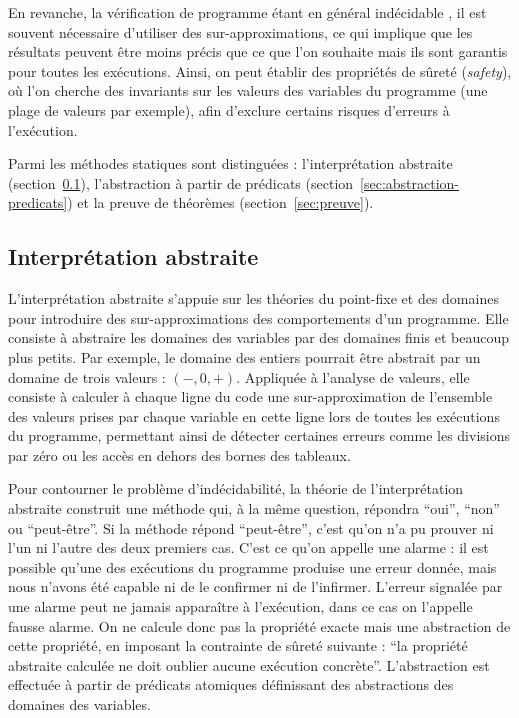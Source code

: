 En revanche, la vérification de programme étant en général indécidable
\cite{Landi/92}, il est souvent nécessaire d'utiliser des
sur-approximations, ce qui implique que les résultats peuvent être moins précis
que ce que l'on souhaite mais ils sont garantis pour toutes les exécutions.
Ainsi, on peut établir des propriétés de sûreté ({\em safety}), où l’on cherche
des invariants sur les valeurs des variables du programme (une plage de valeurs
par exemple), afin d'exclure certains risques d'erreurs à l'exécution.

Parmi les méthodes statiques sont distinguées : l'interprétation abstraite
(section~\ref{sec:interpretation-abstraite}), l'abstraction à partir de
prédicats (section~\ref{sec:abstraction-predicats}) et la preuve de théorèmes
(section~\ref{sec:preuve}).


\subsection{Interprétation abstraite}
\label{sec:interpretation-abstraite}

L'interprétation abstraite \cite{Cousot/92} s'appuie sur les
théories du point-fixe et des domaines pour introduire des sur-approximations
des comportements d'un programme. Elle consiste à abstraire les domaines des
variables par des domaines finis et beaucoup plus petits. Par exemple, le
domaine des entiers pourrait être abstrait par un domaine de trois valeurs :
$(-, 0, +)$. Appliquée à l’analyse de valeurs, elle consiste à calculer à
chaque ligne du code une sur-approximation de l’ensemble des valeurs prises par
chaque variable en cette ligne lors de toutes les exécutions du programme,
permettant ainsi de détecter certaines erreurs comme les divisions par zéro ou
les accès en dehors des bornes des tableaux.

Pour contourner le problème d’indécidabilité, la théorie de l’interprétation
abstraite construit une méthode qui, à la même question, répondra ``oui'',
``non'' ou ``peut-être''. Si la méthode répond ``peut-être'', c’est qu’on n’a pu
prouver ni l’un ni l’autre des deux premiers cas. C’est ce qu’on appelle une
alarme : il est possible qu’une des exécutions du programme produise une erreur
donnée, mais nous n’avons été capable ni de le confirmer ni de l’infirmer.
L’erreur signalée par une alarme peut ne jamais apparaître à l’exécution, dans
ce cas on l’appelle fausse alarme. On ne calcule donc pas la propriété exacte
mais une abstraction de cette propriété, en imposant la contrainte de sûreté
suivante : ``la propriété abstraite calculée ne doit oublier aucune exécution
concrète''. L'abstraction est effectuée à partir de prédicats atomiques
définissant des abstractions des domaines des variables.

